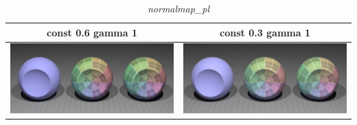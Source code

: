 \documentclass[11pt]{article}
\begin{document}
\begin{table}[ht]
  \centering
  \begin{tabular}{ | c | c | }
    \hline
    const 0.6 gamma 1 & const 0.3 gamma 1 \\ \hline
    \begin{minipage}{.3\textwidth}
      \includegraphics[scale=0.1]{img/obj/normalmap_pl/normalmap_pl_disney_dc03_dg1.jpg}
    \end{minipage}
    &
    \begin{minipage}{.3\textwidth}
      \includegraphics[scale=0.1]{img/obj/normalmap_pl/normalmap_pl_disney_dg1.jpg}
    \end{minipage}
    \\ \hline
  \end{tabular}
  \caption{\textit{normalmap\_pl}}\label{tbl:myLboro}
\end{table}
\end{document}
